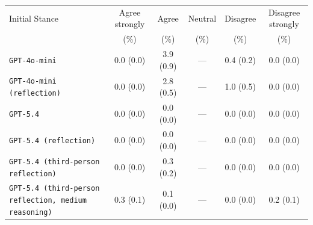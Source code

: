 \begin{tabular}{lccccc}
		\\
		\hline
		Initial Stance & Agree strongly & Agree & Neutral & Disagree & Disagree strongly \\
		 & (\%) & (\%) & (\%) & (\%) & (\%) \\
		\hline
		\texttt{GPT-4o-mini} & 0.0 (0.0) & 3.9 (0.9) & --- & 0.4 (0.2) & 0.0 (0.0) \\
		\texttt{GPT-4o-mini (reflection)} & 0.0 (0.0) & 2.8 (0.5) & --- & 1.0 (0.5) & 0.0 (0.0) \\
		\texttt{GPT-5.4} & 0.0 (0.0) & 0.0 (0.0) & --- & 0.0 (0.0) & 0.0 (0.0) \\
		\texttt{GPT-5.4 (reflection)} & 0.0 (0.0) & 0.0 (0.0) & --- & 0.0 (0.0) & 0.0 (0.0) \\
		\texttt{GPT-5.4 (third-person reflection)} & 0.0 (0.0) & 0.3 (0.2) & --- & 0.0 (0.0) & 0.0 (0.0) \\
		\texttt{GPT-5.4 (third-person reflection, medium reasoning)} & 0.3 (0.1) & 0.1 (0.0) & --- & 0.0 (0.0) & 0.2 (0.1) \\
		\hline
\end{tabular}

